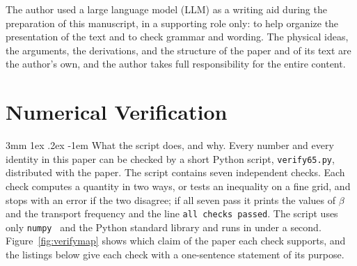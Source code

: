 \documentclass[%
 reprint, amsmath,amssymb, aps, prb, ]{revtex4-2}
\makeatletter
\numberwithin{equation}{section}
\renewcommand\paragraph{%
  \@startsection{paragraph}{4}{\z@}%
    {3mm \@plus 1ex \@minus .2ex}%
    {-1em}%
    {\normalfont\normalsize\itshape}}
\makeatother
\begin{document}
\begin{acknowledgments}
The author used a large language model (LLM) as a writing aid during the preparation of this manuscript, in a supporting role only: to help organize the presentation of the text and to check grammar and wording. The physical ideas, the arguments, the derivations, and the structure of the paper and of its text are the author's own, and the author takes full responsibility for the entire content.
\end{acknowledgments}

\appendix

\section{Numerical Verification}
\label{app:numeric}

\paragraph{What the script does, and why.} Every number and every identity in this paper can be checked by a short Python script, \texttt{verify65.py}, distributed with the paper. The script contains seven independent checks. Each check computes a quantity in two ways, or tests an inequality on a fine grid, and stops with an error if the two disagree; if all seven pass it prints the values of $\beta$ and the transport frequency and the line \texttt{all checks passed}. The script uses only \texttt{numpy}~\cite{ref:numpy} and the Python standard library and runs in under a second. Figure~\ref{fig:verifymap} shows which claim of the paper each check supports, and the listings below give each check with a one-sentence statement of its purpose.
\end{document}
